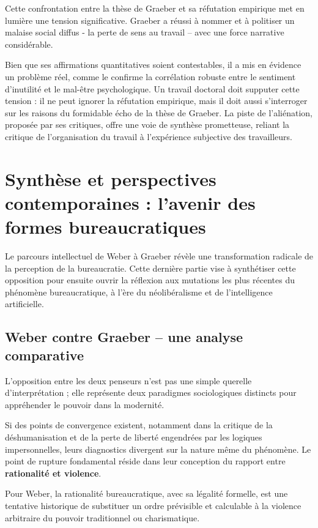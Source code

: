 Cette confrontation entre la thèse de Graeber et sa réfutation empirique met en lumière une tension significative. Graeber a réussi à nommer et à politiser un malaise social diffus - la perte de sens au travail – avec une force narrative considérable.

Bien que ses affirmations quantitatives soient contestables, il a mis en évidence un problème réel, comme le confirme la corrélation robuste entre le sentiment d'inutilité et le mal-être psychologique. Un travail doctoral doit supputer cette tension : il ne peut ignorer la réfutation empirique, mais il doit aussi s'interroger sur les raisons du formidable écho de la thèse de Graeber. La piste de l'aliénation, proposée par ses critiques, offre une voie de synthèse prometteuse, reliant la critique de l'organisation du travail à l'expérience subjective des travailleurs.

\chapter{Synthèse et perspectives contemporaines : l'avenir des formes bureaucratiques}

Le parcours intellectuel de Weber à Graeber révèle une transformation radicale de la perception de la bureaucratie. Cette dernière partie vise à synthétiser cette opposition pour ensuite ouvrir la réflexion aux mutations les plus récentes du phénomène bureaucratique, à l'ère du néolibéralisme et de l'intelligence artificielle.

\section{Weber contre Graeber – une analyse comparative}

L'opposition entre les deux penseurs n'est pas une simple querelle d'interprétation ; elle représente deux paradigmes sociologiques distincts pour appréhender le pouvoir dans la modernité. 

Si des points de convergence existent, notamment dans la critique de la déshumanisation et de la perte de liberté engendrées par les logiques impersonnelles, leurs diagnostics divergent sur la nature même du phénomène. Le point de rupture fondamental réside dans leur conception du rapport entre \textbf{rationalité et violence}.

Pour Weber, la rationalité bureaucratique, avec sa légalité formelle, est une tentative historique de substituer un ordre prévisible et calculable à la violence arbitraire du pouvoir traditionnel ou charismatique.

